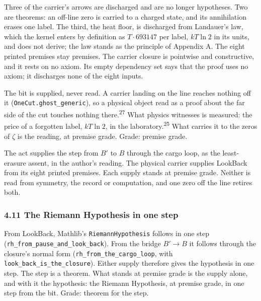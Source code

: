 \documentclass[10pt]{article}
\newenvironment{jbox}[2]{\par\vspace{7pt}\noindent{\color{accent}\rule{\linewidth}{0.8pt}}\par\nopagebreak[4]\vspace{1pt}%
  \noindent{\small\bfseries{\color{accent}Box #1}\enspace\textbar\enspace{\color{deep}#2}}\par\nopagebreak[4]\vspace{2pt}\small\setlength{\parindent}{0pt}\setlength{\parskip}{3pt}}%
  {\par\vspace{2pt}\noindent{\color{accent!45}\rule{\linewidth}{0.4pt}}\par\vspace{7pt}}
\begin{document}
Three of the carrier's arrows are discharged and are no longer
hypotheses. Two are theorems: an off-line zero is carried to a charged
state, and its annihilation erases one label. The third, the heat floor,
is discharged from Landauer's law, which the kernel enters by definition
as \(T \cdot 693147\) per label, \(kT \ln 2\) in its units, and does not
derive; the law stands as the principle of Appendix A. The eight printed
premises stay premises. The carrier closure is pointwise and
constructive, and it rests on no axiom. Its empty dependency set says
that the proof uses no axiom; it discharges none of the eight inputs.

The bit is supplied, never read. A carrier landing on the line reaches
nothing off it
(\texttt{OneCut.\allowbreak{}ghost\_\allowbreak{}generic}), so a
physical object read as a proof about the far side of the cut touches
nothing there.\textsuperscript{27} What physics witnesses is measured:
the price of a forgotten label, \(kT \ln 2\), in the
laboratory.\textsuperscript{25} What carries it to the zeros of
\(\zeta\) is the reading, at premise grade. Grade: premise grade.

\begin{jbox}{4}{Two supplies, one bit}

The act supplies the step from \(B'\) to \(B\) through the cargo loop,
as the least-erasure assent, in the author's reading. The physical
carrier supplies LookBack from its eight printed premises. Each supply
stands at premise grade. Neither is read from symmetry, the record or
computation, and one zero off the line retires both.

\end{jbox}

\hypertarget{the-riemann-hypothesis-in-one-step}{%
\subsubsection{4.11 The Riemann Hypothesis in one
step}\label{the-riemann-hypothesis-in-one-step}}

From LookBack, Mathlib's \texttt{RiemannHypothesis} follows in one step
(\texttt{rh\_\allowbreak{}from\_\allowbreak{}pause\_\allowbreak{}and\_\allowbreak{}look\_\allowbreak{}back}).
From the bridge \(B' \to B\) it follows through the closure's normal
form
(\texttt{rh\_\allowbreak{}from\_\allowbreak{}the\_\allowbreak{}cargo\_\allowbreak{}loop},
with
\texttt{look\_\allowbreak{}back\_\allowbreak{}is\_\allowbreak{}the\_\allowbreak{}closure}).
Either supply therefore gives the hypothesis in one step. The step is a
theorem. What stands at premise grade is the supply alone, and with it
the hypothesis: the Riemann Hypothesis, at premise grade, in one step
from the bit. Grade: theorem for the step.
\end{document}
